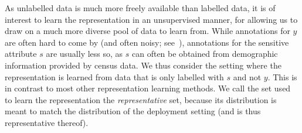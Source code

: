 As unlabelled data is much more freely available than labelled data, it is of interest to learn the
representation in an unsupervised manner, for allowing us to draw on a much more diverse pool of
data to learn from.
While annotations for $y$ are often hard to come by (and often noisy;
see~\cite{kehrenberg2020tuning}), annotations for the sensitive attribute $s$ are usually less so,
as $s$ can often be obtained from demographic information provided by census data. 
%
We thus consider the setting where the representation is learned from data that is only labelled
with $s$ and not $y$. 
%
This is in contrast to most other representation learning methods.
We call the set used to learn the representation the \emph{representative} set, because its
distribution is meant to match the distribution of the deployment setting (and is thus
representative thereof).

